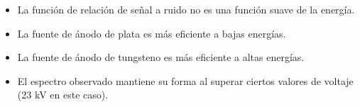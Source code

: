 \documentclass{sciposter}
\begin{document}
\begin{multicols}{3}
	\begin{itemize}
		\item La función de relación de señal a ruido no es una función suave de la energía.
		\item La fuente de ánodo de plata es más eficiente a bajas energías.
		\item La fuente de ánodo de tungsteno es más eficiente a altas energías.
		\item El espectro observado mantiene su forma al superar ciertos valores de voltaje (23 kV en este caso).
	\end{itemize}
%	 

\nocite{als2011elements,ballabriga2011medipix3, van2014scikit}

%

\small


\end{multicols}
\end{document}
